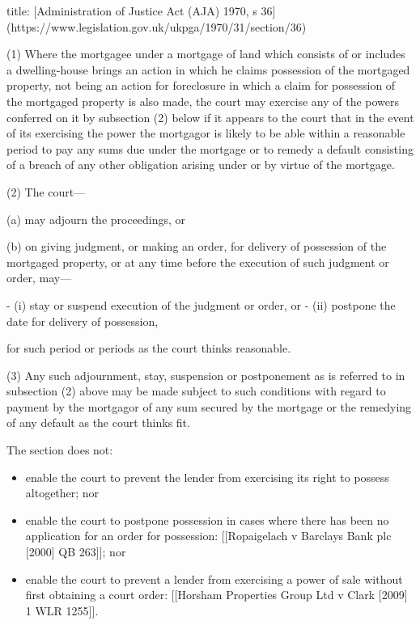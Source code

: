 \documentclass[
]{article}
\newenvironment{Shaded}{}{}
\newcommand{\NormalTok}[1]{#1}
\providecommand{\tightlist}{%
  \setlength{\itemsep}{0pt}\setlength{\parskip}{0pt}}
\begin{document}
\begin{Shaded}
\begin{Highlighting}[]
\NormalTok{title: [Administration of Justice Act (AJA) 1970, s 36](https://www.legislation.gov.uk/ukpga/1970/31/section/36)}

\NormalTok{(1) Where the mortgagee under a mortgage of land which consists of or includes a dwelling{-}house brings an action in which he claims possession of the mortgaged property, not being an action for foreclosure in which a claim for possession of the mortgaged property is also made, the court may exercise any of the powers conferred on it by subsection (2) below if it appears to the court that in the event of its exercising the power the mortgagor is likely to be able within a reasonable period to pay any sums due under the mortgage or to remedy a default consisting of a breach of any other obligation arising under or by virtue of the mortgage. }

\NormalTok{(2) The court—}

\NormalTok{(a) may adjourn the proceedings, or}

\NormalTok{(b) on giving judgment, or making an order, for delivery of possession of the mortgaged property, or at any time before the execution of such judgment or order, may—}

\NormalTok{{-} (i) stay or suspend execution of the judgment or order, or}
\NormalTok{{-} (ii) postpone the date for delivery of possession,}

\NormalTok{for such period or periods as the court thinks reasonable. }

\NormalTok{(3) Any such adjournment, stay, suspension or postponement as is referred to in subsection (2) above may be made subject to such conditions with regard to payment by the mortgagor of any sum secured by the mortgage or the remedying of any default as the court thinks fit.}
\end{Highlighting}
\end{Shaded}

The section does not:

\begin{itemize}
\tightlist
\item
  enable the court to prevent the lender from exercising its right to
  possess altogether; nor
\item
  enable the court to postpone possession in cases where there has been
  no application for an order for possession: {[}{[}Ropaigelach v
  Barclays Bank plc {[}2000{]} QB 263{]}{]}; nor
\item
  enable the court to prevent a lender from exercising a power of sale
  without first obtaining a court order: {[}{[}Horsham Properties Group
  Ltd v Clark {[}2009{]} 1 WLR 1255{]}{]}.
\end{itemize}
\end{document}
